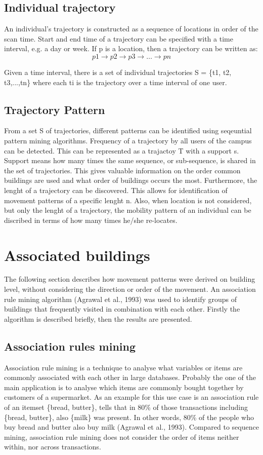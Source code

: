 \subsection{Individual trajectory}
An individual’s trajectory is constructed as a sequence of locations in order of the scan time. Start and end time of a trajectory can be specified with a time interval, e.g. a day or week. If p is a location, then a trajectory can be written as:
$$p1 \rightarrow p2 \rightarrow p3 \rightarrow …\rightarrow pn$$

Given a time interval, there is a set of individual trajectories S = \{t1, t2, t3,...,tn\} where each ti is the trajectory over a time interval of one user. 

\subsection{Trajectory Pattern}
From a set S of trajectories, different patterns can be identified using seqeuntial pattern mining algorithms. Frequency of a trajectory by all users of the campus can be detected. This can be represented as a trajactoy T with a support s. Support means how many times the same sequence, or sub-sequence, is shared in the set of trajectories. This gives valuable information on the order common buildings are used and what order of buildings occurs the most. Furthermore, the lenght of a trajectory can be discovered. This allows for identification of movement patterns of a specific lenght n. Also, when location is not considered, but only the lenght of a trajectory, the mobility pattern of an individual can be discribed in terms of how many times he/she re-locates. 

\section{Associated buildings}\label{Associated buildings}

The following section describes how movement patterns were derived on building level, without considering the direction or order of the movement. An association rule mining algorithm (Agrawal et al., 1993) was used to identify groups of buildings that frequently visited in combination with each other. Firstly the algorithm is described briefly, then the results are presented.
\subsection{Association rules mining}
Association rule mining is a technique to analyse what variables or items are commonly associated with each other in large databases. Probably the one of the main application is to analyse which items are commonly bought together by customers of a supermarket. As an example for this use case is an association rule of an itemset \{bread, butter\}, tells that in 80\% of those transactions including \{bread, butter\}, also \{milk\}  was present. In other words, 80\% of the people who buy bread and butter also buy milk (Agrawal et al., 1993). Compared to sequence mining, association rule mining does not consider the order of items neither within, nor across transactions.

